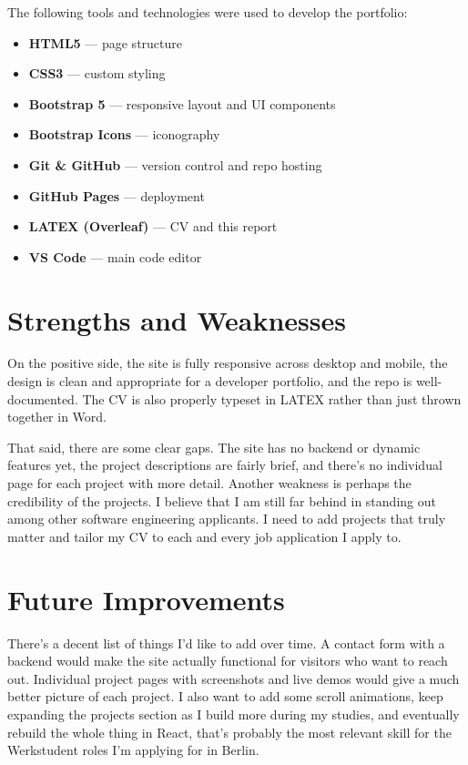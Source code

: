 \documentclass[12pt, a4paper]{article}
\begin{document}
The following tools and technologies were used to develop the portfolio:

\begin{itemize}[noitemsep]
    \item \textbf{HTML5} --- page structure
    \item \textbf{CSS3} --- custom styling
    \item \textbf{Bootstrap 5} --- responsive layout and UI components
    \item \textbf{Bootstrap Icons} --- iconography
    \item \textbf{Git \& GitHub} --- version control and repo hosting
    \item \textbf{GitHub Pages} --- deployment
    \item \textbf{LATEX (Overleaf)} --- CV and this report
    \item \textbf{VS Code} --- main code editor
\end{itemize}

\section{Strengths and Weaknesses}

On the positive side, the site is fully responsive across desktop and mobile, the design is clean and appropriate for a developer portfolio, and the repo is well-documented. The CV is also properly typeset in LATEX rather than just thrown together in Word.

That said, there are some clear gaps. The site has no backend or dynamic features yet, the project descriptions are fairly brief, and there's no individual page for each project with more detail. Another weakness is perhaps the credibility of the projects. I believe that I am still far behind in standing out among other software engineering applicants. I need to add projects that truly matter and tailor my CV to each and every job application I apply to.  
\section{Future Improvements}

There's a decent list of things I'd like to add over time. A contact form with a backend would make the site actually functional for visitors who want to reach out. Individual project pages with screenshots and live demos would give a much better picture of each project. I also want to add some scroll animations, keep expanding the projects section as I build more during my studies, and eventually rebuild the whole thing in React, that's probably the most relevant skill for the Werkstudent roles I'm applying for in Berlin.
\end{document}
